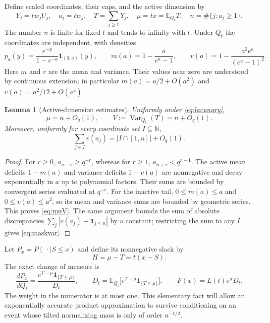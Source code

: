 \documentclass[11pt,letterpaper]{article}
\numberwithin{equation}{section}
\newtheorem{lemma}[theorem]{Lemma}
\theoremstyle{definition}
\theoremstyle{remark}
\newcommand{\EE}{\mathbb E}
\newcommand{\NN}{\mathbb N}
\newcommand{\ind}{\mathbf 1}
\newcommand{\Var}{\operatorname{Var}}
\begin{document}
Define scaled coordinates, their caps, and the active dimension by
\begin{equation}
 Y_j=tw_jU_j,\quad a_j=tw_j,\quad
 T=\sum_{j\ge1}Y_j,\quad
 \mu=tx=\EE_{Q_t}T,\quad
 n=\#\{j:a_j\ge1\}.
 \label{eq:coordinates}
\end{equation}
The number $n$ is finite for fixed $t$ and tends to infinity with $t$.
Under $Q_t$ the coordinates are independent, with densities
\begin{equation}
 p_a(y)=\frac{e^{-y}}{1-e^{-a}}\ind_{(0,a)}(y),\qquad
 m(a)=1-\frac{a}{e^a-1},\qquad
 v(a)=1-\frac{a^2e^a}{(e^a-1)^2}.
 \label{eq:truncexp}
\end{equation}
Here $m$ and $v$ are the mean and variance. Their values near zero are understood
by continuous extension; in particular $m(a)=a/2+O(a^2)$ and
$v(a)=a^2/12+O(a^4)$.

\begin{lemma}[Active-dimension estimates]
\label{lem:dimension}
Uniformly under \eqref{eq:lacunary},
\begin{equation}
 \mu=n+O_q(1),\qquad V:=\Var_{Q_t}(T)=n+O_q(1).
 \label{eq:muV}
\end{equation}
Moreover, uniformly for every coordinate set $I\subseteq\NN$,
\begin{equation}
 \sum_{j\in I}v(a_j)=|I\cap[1,n]|+O_q(1).
 \label{eq:maskvar}
\end{equation}
\end{lemma}
\begin{proof}
For $r\ge0$, $a_{n-r}\ge q^{-r}$, whereas for $r\ge1$,
$a_{n+r}<q^{r-1}$. The active mean deficits $1-m(a)$ and variance deficits
$1-v(a)$ are nonnegative and decay exponentially in $a$ up to polynomial
factors. Their sums are bounded by convergent series evaluated at $q^{-r}$.
For the inactive tail, $0\le m(a)\le a$ and $0\le v(a)\le a^2$, so its
mean and variance sums are bounded by geometric series. This proves
\eqref{eq:muV}. The same argument bounds the sum of absolute discrepancies
$\sum_j|v(a_j)-\ind_{j\le n}|$ by a constant; restricting the sum to any $I$
gives \eqref{eq:maskvar}.
\end{proof}

Let $P_x=P(\,\cdot\mid S\le x)$ and define its nonnegative slack by
\begin{equation}
 H=\mu-T=t(x-S).
 \label{eq:slack}
\end{equation}
The exact change of measure is
\begin{equation}
 \frac{dP_x}{dQ_t}=
 \frac{e^{T-\mu}\ind_{\{T\le\mu\}}}{D_t},\qquad
 D_t=\EE_{Q_t}\big[e^{T-\mu}\ind_{\{T\le\mu\}}\big],\qquad
 F(x)=L(t)e^\mu D_t.
 \label{eq:weight}
\end{equation}
The weight in the numerator is at most one. This elementary fact will allow
an exponentially accurate product approximation to survive conditioning on
an event whose tilted normalizing mass is only of order $n^{-1/2}$.
\end{document}
